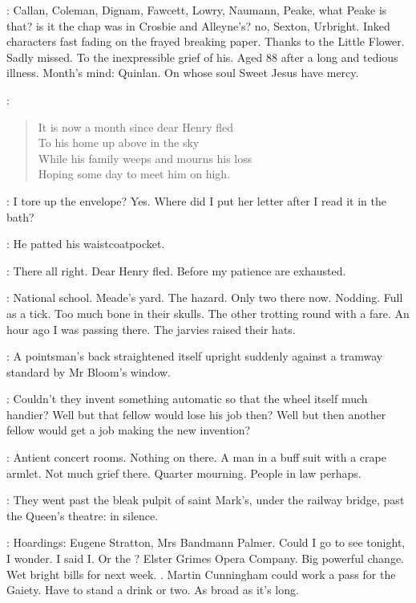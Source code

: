 \BloomInt:
Callan, Coleman, Dignam, Fawcett, Lowry, Naumann,
Peake, what Peake is that?
is it the chap was in Crosbie and Alleyne's?
no, Sexton, Urbright.
Inked characters fast fading on the frayed breaking paper.
Thanks to the Little Flower.
Sadly missed.
To the inexpressible grief of his.
Aged 88 after a long and tedious illness.
Month's mind:
Quinlan.
On whose soul Sweet Jesus have mercy.

:
\begin{verse}
    It is now a month since dear Henry fled \\
    To his home up above in the sky \\
    While his family weeps and mourns his loss \\
    Hoping some day to meet him on high.
\end{verse}

\BloomInt:
I tore up the envelope?
Yes.
Where did I put her letter after I read it in the bath?

:
He patted his waistcoatpocket.

\BloomInt:
There all right.
Dear Henry fled.
Before my patience
are exhausted.

\BloomInt:
National school.
Meade's yard.
The hazard.
Only two there now.
Nodding.
Full as a tick.
Too much bone in their skulls.
The other trotting round with a fare.
An hour ago I was passing there.
The jarvies raised their hats.

:
A pointsman's back straightened itself upright
suddenly against a tramway standard
by Mr Bloom's window.

\BloomInt:
Couldn't they invent something automatic so that the wheel itself much handier?
Well but that fellow would lose his job then?
Well but then another fellow would get a job making the new invention?

\BloomInt:
Antient concert rooms.
Nothing on there.
A man in a buff suit with a crape armlet.
Not much grief there.
Quarter mourning.
People in law perhaps.

:
They went past the bleak pulpit of saint Mark's,
under the railway bridge,
past the Queen's theatre:
in silence.

\BloomInt:
Hoardings:
Eugene Stratton,
Mrs Bandmann Palmer.
Could I go to see  tonight, I wonder.
I said I.
Or the ?
Elster Grimes Opera Company.
Big powerful change.
Wet bright bills for next week.
.
Martin Cunningham could work a pass for the Gaiety.
Have to stand a drink or two.
As broad as it's long.

